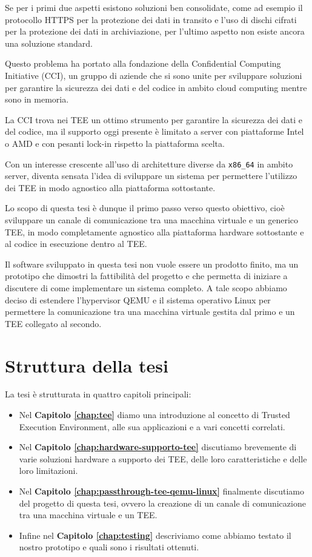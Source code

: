 \documentclass[12pt,italian]{report}
\begin{document}
Se per i primi due aspetti esistono soluzioni ben consolidate, come ad
esempio il protocollo HTTPS per la protezione dei dati in transito e
l'uso di dischi cifrati per la protezione dei dati in archiviazione,
per l'ultimo aspetto non esiste ancora una soluzione standard.

Questo problema ha portato alla fondazione
della Confidential Computing Initiative (CCI), un gruppo di aziende che
si sono unite per sviluppare soluzioni per garantire la sicurezza dei dati
e del codice in ambito cloud computing mentre sono in memoria.

La CCI trova nei TEE un ottimo strumento per garantire la sicurezza dei dati
e del codice, ma il supporto oggi presente è limitato a server con
piattaforme Intel o AMD e con pesanti lock-in rispetto la piattaforma scelta.

Con un interesse crescente all'uso di architetture diverse da \texttt{x86\_64}
in ambito server, diventa sensata l'idea di sviluppare un sistema per
permettere l'utilizzo dei TEE in modo agnostico alla piattaforma sottostante.

\bigbreak \noindent

Lo scopo di questa tesi è dunque il primo passo verso questo obiettivo,
cioè sviluppare un canale di comunicazione tra una macchina virtuale e
un generico TEE, in modo completamente agnostico alla piattaforma
hardware sottostante e al codice in esecuzione dentro al TEE.

Il software sviluppato in questa tesi non vuole essere un prodotto finito,
ma un prototipo che dimostri la fattibilità del progetto e che permetta
di iniziare a discutere di come implementare un sistema completo.
A tale scopo abbiamo deciso di estendere l'hypervisor QEMU e il sistema
operativo Linux per permettere la comunicazione tra una macchina virtuale
gestita dal primo e un TEE collegato al secondo.

\section{Struttura della tesi}
\label{sec:struttura-tesi}
La tesi è strutturata in quattro capitoli principali:
\begin{itemize}
    \item Nel \textbf{Capitolo \ref{chap:tee}} diamo una introduzione al
    concetto di Trusted Execution Environment, alle sua applicazioni
    e a vari concetti correlati.
    \item Nel \textbf{Capitolo \ref{chap:hardware-supporto-tee}} discutiamo
    brevemente di varie soluzioni hardware a supporto dei TEE, delle loro
    caratteristiche e delle loro limitazioni.
    \item Nel \textbf{Capitolo \ref{chap:passthrough-tee-qemu-linux}}
    finalmente discutiamo del progetto di questa tesi, ovvero la creazione
    di un canale di comunicazione tra una macchina virtuale e un TEE.
    \item Infine nel \textbf{Capitolo \ref{chap:testing}} descriviamo
    come abbiamo testato il nostro prototipo e quali sono i risultati
    ottenuti.
\end{itemize}
\end{document}

